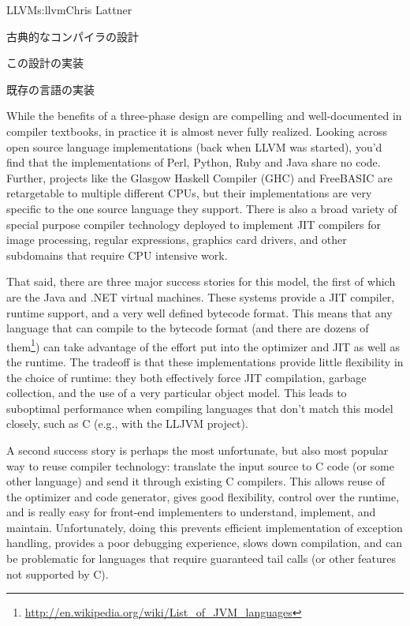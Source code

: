 \begin{aosachapter}{LLVM}{s:llvm}{Chris Lattner}
\begin{aosasect1}{古典的なコンパイラの設計}
\begin{aosasect2}{この設計の実装}
\end{aosasect2}

\end{aosasect1}

\begin{aosasect1}{既存の言語の実装}

While the benefits of a three-phase design are compelling and
well-documented in compiler textbooks, in practice it is almost never
fully realized. Looking across open source language implementations
(back when LLVM was started), you'd find that the implementations of
Perl, Python, Ruby and Java share no code.  Further, projects like the
Glasgow Haskell Compiler (GHC) and FreeBASIC are retargetable to
multiple different CPUs, but their implementations are very specific
to the one source language they support.  There is also a broad
variety of special purpose compiler technology deployed to implement
JIT compilers for image processing, regular expressions, graphics card
drivers, and other subdomains that require CPU intensive work.

That said, there are three major success stories for this model, the
first of which are the Java and .NET virtual machines.  These systems
provide a JIT compiler, runtime support, and a very well defined
bytecode format.  This means that any language that can compile to the
bytecode format (and there are dozens of
them\footnote{\url{http://en.wikipedia.org/wiki/List_of_JVM_languages}})
can take advantage of the effort put into the optimizer and JIT as
well as the runtime.  The tradeoff is that these implementations
provide little flexibility in the choice of runtime: they both
effectively force JIT compilation, garbage collection, and the use of
a very particular object model.  This leads to suboptimal performance
when compiling languages that don't match this model closely, such as
C (e.g., with the LLJVM project).

A second success story is perhaps the most unfortunate, but
also most popular way to reuse compiler technology: translate the input
source to C code (or some other language) and send it through existing
C compilers.  This allows reuse of the optimizer and code generator,
gives good flexibility, control over the runtime, and is really easy
for front-end implementers to understand, implement, and maintain.
Unfortunately, doing this prevents efficient implementation of
exception handling, provides a poor debugging experience, slows down
compilation, and can be problematic for languages that require guaranteed
tail calls (or other features not supported by C).


\end{aosasect1}
\end{aosachapter}
